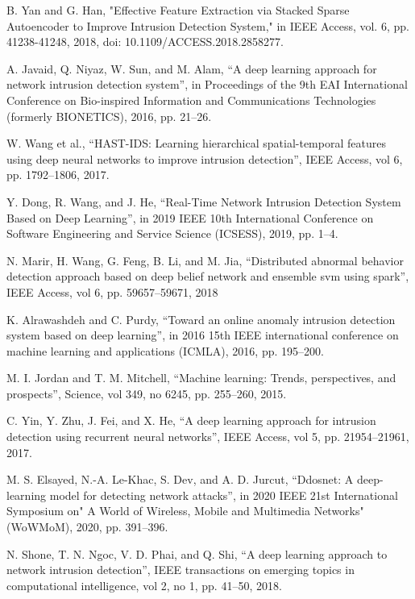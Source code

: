 \documentclass[conference]{IEEEtran}
\begin{document}
\begin{thebibliography}{00}
 B. Yan and G. Han, "Effective Feature Extraction via Stacked Sparse Autoencoder to Improve Intrusion Detection System," in IEEE Access, vol. 6, pp. 41238-41248, 2018, doi: 10.1109/ACCESS.2018.2858277.

A. Javaid, Q. Niyaz, W. Sun, and M. Alam, “A deep learning approach for network intrusion detection system”, in Proceedings of the 9th EAI International Conference on Bio-inspired Information and Communications Technologies (formerly BIONETICS), 2016, pp. 21–26.

 W. Wang et al., “HAST-IDS: Learning hierarchical spatial-temporal features using deep neural networks to improve intrusion detection”, IEEE Access, vol 6, pp. 1792–1806, 2017.

 Y. Dong, R. Wang, and J. He, “Real-Time Network Intrusion Detection System Based on Deep Learning”, in 2019 IEEE 10th International Conference on Software Engineering and Service Science (ICSESS), 2019, pp. 1–4.

N. Marir, H. Wang, G. Feng, B. Li, and M. Jia, “Distributed abnormal behavior detection approach based on deep belief network and ensemble svm using spark”, IEEE Access, vol 6, pp. 59657–59671, 2018

 K. Alrawashdeh and C. Purdy, “Toward an online anomaly intrusion detection system based on deep learning”, in 2016 15th IEEE international conference on machine learning and applications (ICMLA), 2016, pp. 195–200.

 M. I. Jordan and T. M. Mitchell, “Machine learning: Trends, perspectives, and prospects”, Science, vol 349, no 6245, pp. 255–260, 2015.

 C. Yin, Y. Zhu, J. Fei, and X. He, “A deep learning approach for intrusion detection using recurrent neural networks”, IEEE Access, vol 5, pp. 21954–21961, 2017.

 M. S. Elsayed, N.-A. Le-Khac, S. Dev, and A. D. Jurcut, “Ddosnet: A deep-learning model for detecting network attacks”, in 2020 IEEE 21st International Symposium on" A World of Wireless, Mobile and Multimedia Networks"(WoWMoM), 2020, pp. 391–396.

 N. Shone, T. N. Ngoc, V. D. Phai, and Q. Shi, “A deep learning approach to network intrusion detection”, IEEE transactions on emerging topics in computational intelligence, vol 2, no 1, pp. 41–50, 2018.


\end{thebibliography}
\end{document}
